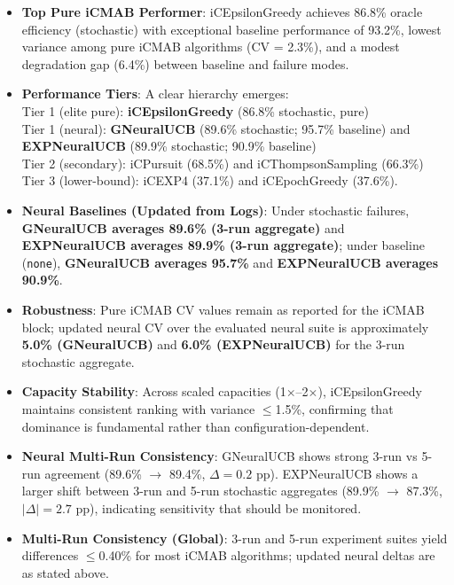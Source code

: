 \documentclass[12pt,a4paper]{article}
\newcommand{\primarytext}[1]{\textcolor{primaryblue}{\textbf{#1}}}
\newcommand{\secondarytext}[1]{\textcolor{secondaryblue}{\textbf{#1}}}
\newcommand{\success}[1]{\textcolor{accentgreen}{\textbf{#1}}}
\newcommand{\legacy}[1]{\textcolor{legacycolor}{\textbf{#1}}}
\newcommand{\neural}[1]{\textcolor{neuralcolor}{\textbf{#1}}}
\begin{document}
\begin{tcolorbox}[colback=highlightgray,colframe=primaryblue,title=\textbf{Executive Summary}]
\begin{itemize}
\item \primarytext{Top Pure iCMAB Performer}: iCEpsilonGreedy achieves 86.8\% oracle efficiency (stochastic) with exceptional baseline performance of 93.2\%, lowest variance among pure iCMAB algorithms (CV = 2.3\%), and a modest degradation gap (6.4\%) between baseline and failure modes.
\item \secondarytext{Performance Tiers}: A clear hierarchy emerges: \\
  \quad Tier 1 (elite pure): \primarytext{iCEpsilonGreedy} (86.8\% stochastic, pure) \\
  \quad Tier 1 (neural): \neural{GNeuralUCB} (89.6\% stochastic; 95.7\% baseline) and \legacy{EXPNeuralUCB} (89.9\% stochastic; 90.9\% baseline) \\
  \quad Tier 2 (secondary): iCPursuit (68.5\%) and iCThompsonSampling (66.3\%) \\
  \quad Tier 3 (lower-bound): iCEXP4 (37.1\%) and iCEpochGreedy (37.6\%).
\item \neural{Neural Baselines (Updated from Logs)}: Under stochastic failures, \neural{GNeuralUCB averages 89.6\% (3-run aggregate)} and \legacy{EXPNeuralUCB averages 89.9\% (3-run aggregate)}; under baseline (\texttt{none}), \neural{GNeuralUCB averages 95.7\%} and \legacy{EXPNeuralUCB averages 90.9\%}.
\item \success{Robustness}: Pure iCMAB CV values remain as reported for the iCMAB block; updated neural CV over the evaluated neural suite is approximately \neural{5.0\% (GNeuralUCB)} and \legacy{6.0\% (EXPNeuralUCB)} for the 3-run stochastic aggregate.
\item \success{Capacity Stability}: Across scaled capacities (1$\times$--2$\times$), iCEpsilonGreedy maintains consistent ranking with variance $\leq$1.5\%, confirming that dominance is fundamental rather than configuration-dependent.
\item \neural{Neural Multi-Run Consistency}: GNeuralUCB shows strong 3-run vs 5-run agreement (89.6\% $\rightarrow$ 89.4\%, $\Delta=0.2$ pp). EXPNeuralUCB shows a larger shift between 3-run and 5-run stochastic aggregates (89.9\% $\rightarrow$ 87.3\%, $|\Delta|=2.7$ pp), indicating sensitivity that should be monitored.
\item \success{Multi-Run Consistency (Global)}: 3-run and 5-run experiment suites yield differences $\leq$0.40\% for most iCMAB algorithms; updated neural deltas are as stated above.

\end{itemize}
\end{tcolorbox}
\end{document}
